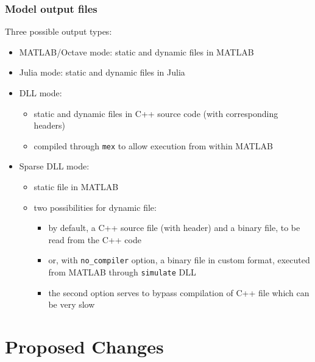 \documentclass[aspectratio=169]{beamer}
\begin{document}
\begin{frame}
  \frametitle{Model output files}
  Three possible output types:
  \begin{itemize}
  \item MATLAB/Octave mode: static and dynamic files in MATLAB
  \item Julia mode: static and dynamic files in Julia
  \item DLL mode:
    \begin{itemize}
    \item static and dynamic files in C++ source code (with corresponding headers)
    \item compiled through \texttt{mex} to allow execution from within MATLAB
    \end{itemize}
  \item Sparse DLL mode:
    \begin{itemize}
    \item static file in MATLAB
    \item two possibilities for dynamic file:
      \begin{itemize}
      \item by default, a C++ source file (with header) and a binary file, to be read from the C++ code
      \item or, with \texttt{no\_compiler} option, a binary file in custom format, executed from MATLAB through \texttt{simulate} DLL
      \item the second option serves to bypass compilation of C++ file which can be very slow
      \end{itemize}
    \end{itemize}
  \end{itemize}
\end{frame}

\section{Proposed Changes}

\newcommand{\asuivre}{\setcounter{sauvegardeenumi}{\theenumi}}
\newcommand{\suite}{\setcounter{enumi}{\thesauvegardeenumi}}
\end{document}
